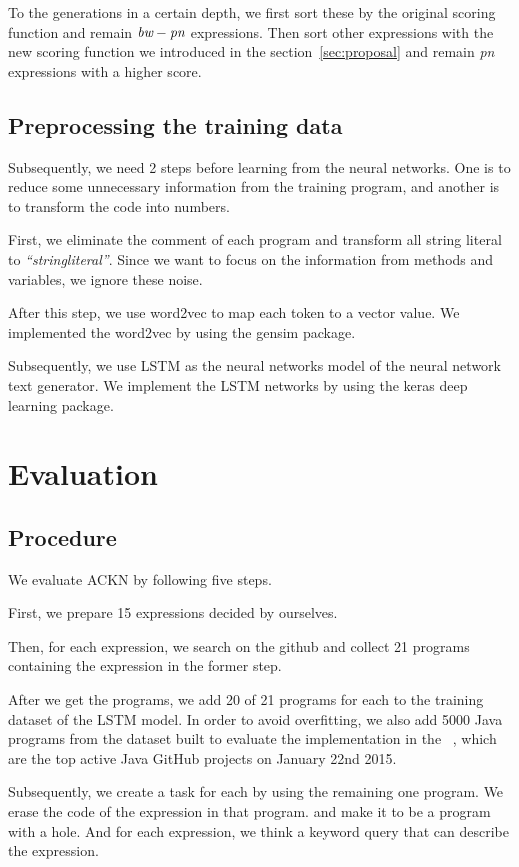 \documentclass[PRO,english]{ipsj}
\begin{document}
To the generations in a certain depth, we first sort these by the original scoring function and remain $\emph{bw} - \emph{pn}$ expressions. Then sort other expressions with the new scoring function we introduced in the section~\ref{sec:proposal} and remain \emph{pn} expressions with a higher score.

\subsection{Preprocessing the training data}
\label{subsection:Preprocessing}
Subsequently, we need 2 steps before learning from the neural networks. One is to reduce some unnecessary information from the training program, and another is to transform the code into numbers.

First, we eliminate the comment of each program and transform all string literal to \textit{``stringliteral''}. Since we want to focus on the information from methods and variables, we ignore these noise.

After this step, we use word2vec to map each token to a vector value. We implemented the word2vec by using the gensim package.

Subsequently, we use LSTM as the neural networks model of the neural network text generator. We implement the LSTM networks by using the keras deep learning package.

\section{Evaluation}\label{sec:evaluation}
\subsection{Procedure}
We evaluate ACKN by following five steps. 

First, we prepare 15 expressions decided by ourselves. 

Then, for each expression, we search on the github and collect 21 programs containing the expression in the former step.

After we get the programs, we add 20 of 21 programs for each to the training dataset of the LSTM model. In order to avoid overfitting, we also add 5000 Java programs from the dataset built to evaluate the implementation in the ~\cite{allamanis2015suggesting}, which are the top active Java GitHub projects on January 22nd 2015.

Subsequently, we create a task for each by using the remaining one program. We erase the code of the expression in that program. and make it to be a program with a hole. And for each expression, we think a keyword query that can describe the expression. 
\end{document}
